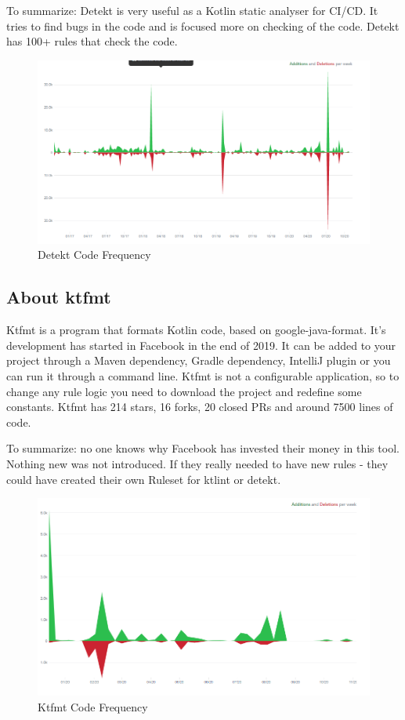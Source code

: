 To summarize: Detekt is very useful as a Kotlin static analyser for CI/CD. It tries to find bugs in the code and is focused more on checking of the code. Detekt has 100+ rules that check the code.

\begin{figure}[H]
    \centering
    \includegraphics[scale = 0.3]{pictures/detekt.png}
    \caption{Detekt Code Frequency}
    \label{fig:png_detekt}
\end{figure}

\subsection{About ktfmt}
Ktfmt is a program that formats Kotlin code, based on google-java-format. It's development has started in Facebook in the end of 2019. It can be added to your project through a Maven dependency, Gradle dependency, IntelliJ plugin or you can run it through a command line. Ktfmt is not a configurable application, so to change any rule logic you need to download the project and redefine some constants. Ktfmt has 214 stars, 16 forks, 20 closed PRs and around 7500 lines of code. 

To summarize: no one knows why Facebook has invested their money in this tool. Nothing new was not introduced. If they really needed to have new rules - they could have created their own Ruleset for ktlint or detekt.

\begin{figure}[H]
    \centering
    \includegraphics[scale = 0.3]{pictures/ktfmt.png}
    \caption{Ktfmt Code Frequency}
    \label{fig:png_ktfmt}
\end{figure}

